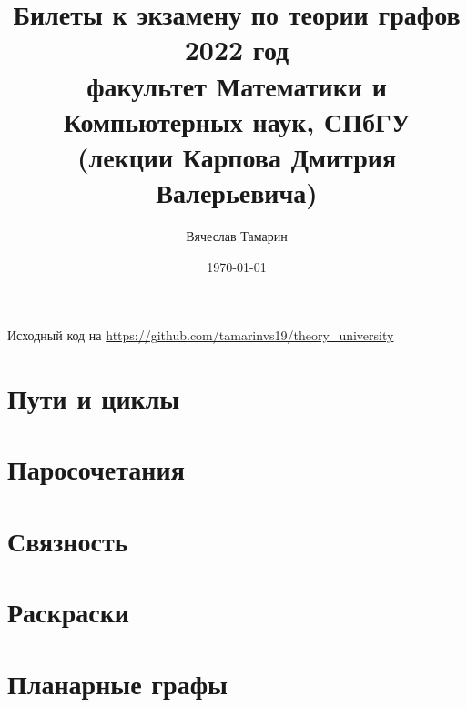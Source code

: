 \documentclass[11pt]{book}
\title{Билеты к экзамену по теории графов\\2022 год\\
    факультет Математики и Компьютерных наук, СПбГУ\\
(лекции Карпова Дмитрия Валерьевича)}
\date{\today}
\author{Вячеслав Тамарин}
\begin{document}
\maketitle
\tableofcontents
\hspace{1em}
\begin{center}
	Исходный код на \url{https://github.com/tamarinvs19/theory_university}
\end{center}
\chapter{Пути и циклы} 
 
 
 
 
 
 
\chapter{Паросочетания}
 
 
 
 
 
 
 
 
\chapter{Связность}
 
 
 
 
 
 

\chapter{Раскраски}


















\chapter{Планарные графы}




\end{document}
